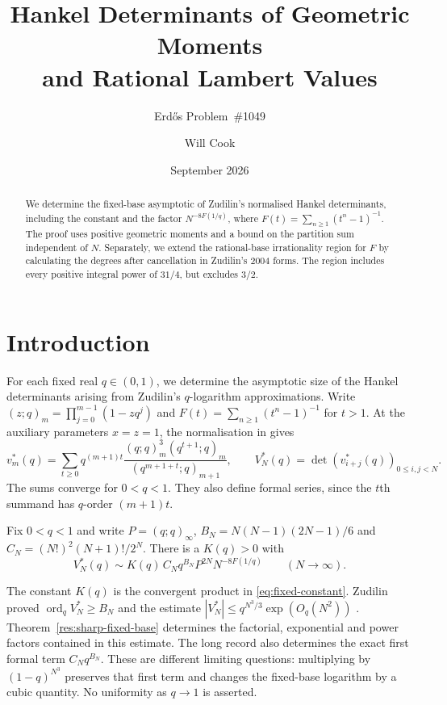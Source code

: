 \documentclass[11pt]{article}
\title{Hankel Determinants of Geometric Moments\\and Rational Lambert Values}
\subtitle{Erd\H{o}s Problem~\#1049}
\author{Will Cook}
\date{September 2026}
\begin{document}
\maketitle
\noteprovenance

\begin{abstract}
We determine the fixed-base asymptotic of Zudilin's normalised Hankel
determinants, including the constant and the factor $N^{-8F(1/q)}$,
where $F(t)=\sum_{n\ge1}(t^n-1)^{-1}$. The proof uses positive
geometric moments and a bound on the partition sum independent of $N$.
Separately, we extend the rational-base irrationality region for $F$
by calculating the degrees after cancellation in Zudilin's 2004 forms. The region includes
every positive integral power of $31/4$, but excludes $3/2$.
\end{abstract}

\section{Introduction}\label{sec:problem}

For each fixed real $q\in(0,1)$, we determine the asymptotic size
of the Hankel determinants arising from Zudilin's $q$-logarithm
approximations. Write
$(z;q)_m=\prod_{j=0}^{m-1}(1-zq^j)$ and
$F(t)=\sum_{n\ge1}(t^n-1)^{-1}$ for $t>1$.
At the auxiliary parameters $x=z=1$, the normalisation in
\cite[(6), \S4]{zudilin2016} gives
\begin{equation}\label{eq:normalised-moments}
 v_m^*(q)=\sum_{t\ge0}q^{(m+1)t}
 \frac{(q;q)_m^3(q^{t+1};q)_m}{(q^{m+1+t};q)_{m+1}},
 \qquad V_N^*(q)=\det(v_{i+j}^*(q))_{0\le i,j<N}.
\end{equation}
The sums converge for $0<q<1$. They also define formal series, since
the $t$th summand has $q$-order $(m+1)t$.

\begin{theorem}\label{res:sharp-fixed-base}
Fix $0<q<1$ and write $P=(q;q)_\infty$, $B_N=N(N-1)(2N-1)/6$ and
$C_N=(N!)^2(N+1)!/2^N$. There is a $K(q)>0$ with
\[
 V_N^*(q)\sim K(q)\,C_Nq^{B_N}P^{2N}N^{-8F(1/q)}
 \qquad(N\to\infty).
\]
\end{theorem}

The constant $K(q)$ is the convergent product in
\eqref{eq:fixed-constant}. Zudilin proved
$\operatorname{ord}_q V_N^*\ge B_N$ and the estimate
$|V_N^*|\le q^{N^3/3}\exp(O_q(N^2))$
\cite[Lemma~1 and \S4]{zudilin2016}. Theorem~\ref{res:sharp-fixed-base} determines the factorial, exponential
and power factors contained in this estimate. The long record also determines the exact
first formal term $C_Nq^{B_N}$. These are different limiting questions: multiplying
by $(1-q)^{N^3}$ preserves that first term and changes the fixed-base
logarithm by a cubic quantity. No uniformity as $q\to1$ is asserted.
\end{document}
